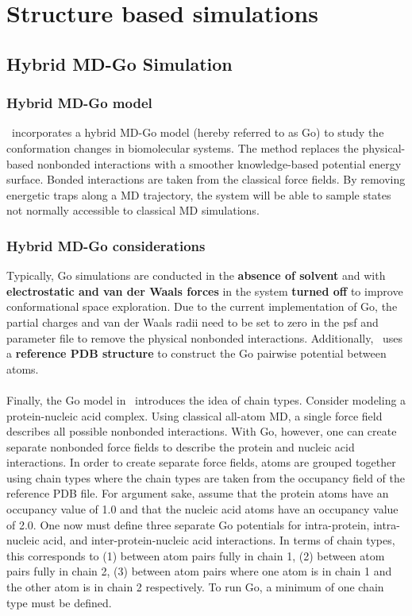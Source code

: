 \section{Structure based simulations}

\subsection{Hybrid MD-Go Simulation}
\label{section:Go simulation}

\subsubsection{Hybrid MD-Go model}

\NAMD\ incorporates a hybrid MD-Go model (hereby referred to as Go)
 to study the conformation changes in biomolecular systems.  The method replaces the physical-based
nonbonded interactions with a smoother knowledge-based potential energy surface.  
Bonded interactions are taken from the classical force fields.
By removing energetic traps along a MD trajectory,
the system will be able to sample states not normally accessible to classical MD simulations.

\subsubsection{Hybrid MD-Go considerations}  
Typically, Go simulations are conducted in the \textbf{absence of solvent} and with
 \textbf{electrostatic and van der Waals forces} in the system \textbf{turned off}
 to improve conformational space exploration.  Due to the current implementation of Go, 
the partial charges and van der Waals radii need to be set to zero in the psf and parameter file
to remove the physical nonbonded interactions.  Additionally, \NAMD\ uses a \textbf{reference PDB structure} 
to construct the Go pairwise potential between atoms.  \\
\\
Finally, the Go model in \NAMD\ introduces the idea of chain types.
Consider modeling a protein-nucleic acid complex.  Using classical all-atom MD, a single force field
 describes all possible nonbonded interactions.  With Go, however, one can create separate nonbonded force fields to describe the protein 
and nucleic acid interactions.  In order to create separate force fields, atoms are grouped together using chain types where the
chain types are taken from the occupancy field of the reference PDB file.  For argument sake, assume that the protein atoms have
an occupancy value of 1.0 and that the nucleic acid atoms have an occupancy value of 2.0.  One now must define three separate Go potentials
for intra-protein, intra-nucleic acid, and inter-protein-nucleic acid interactions.  In terms of chain types, this corresponds to 
 (1) between atom pairs fully in chain 1, (2) between atom pairs fully in chain 2, (3) between atom pairs where one atom is in chain 1 and 
the other atom is in chain 2 respectively.  To run Go, a minimum of one chain type must be defined.

